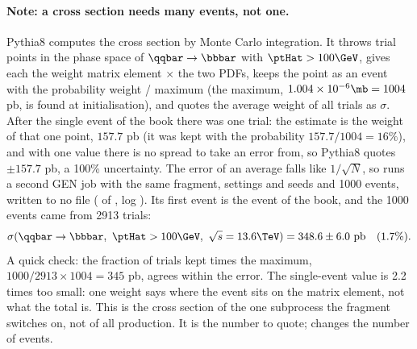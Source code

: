 \paragraph{Note: a cross section needs many events, not one.} Pythia8 computes the cross section by Monte
Carlo integration. It throws trial points in the phase space of $\qqbar\to\bbbar$ with $\ptHat>100\GeV$, gives
each the weight matrix element $\times$ the two PDFs, keeps the point as an event with the probability weight /
maximum (the maximum, $1.004\times10^{-6}\mb = 1004$ pb, is found at initialisation), and quotes the average weight
of all trials as $\sigma$. After the single event of the book there was one trial: the estimate is the weight
of that one point, $157.7$ pb (it was kept with the probability $157.7/1004 = 16\%$), and with one value there
is no spread to take an error from, so Pythia8 quotes $\pm157.7$ pb, a 100\% uncertainty. The error of an average
falls like $1/\sqrt{N}$, so  runs a second GEN job with the same fragment, settings and seeds and
1000 events, written to no file ( of , log ).
Its first event is the event of the book, and the 1000 events came from 2913 trials:
\[
  \sigma(\qqbar\to\bbbar,\ \ptHat>100\GeV,\ \sqrt{s}=13.6\TeV) = 348.6\pm6.0~\mathrm{pb}\quad(1.7\%).
\]
A quick check: the fraction of trials kept times the maximum, $1000/2913\times1004 = 345$ pb, agrees within the
error. The single-event value is 2.2 times too small: one weight says where the event sits on the matrix element,
not what the total is. This is the cross section of the one subprocess the fragment switches on, not of all \bbbar{}
production. It is the number to quote;  changes the number of events.

